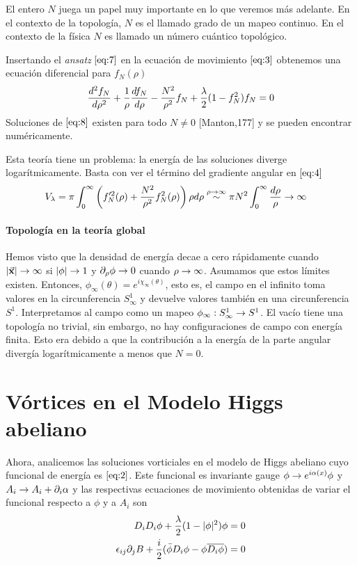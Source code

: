 El entero $N$ juega un papel muy importante en lo que veremos más adelante. En el contexto de la topología, $N$ es el llamado grado de un mapeo continuo. En el contexto de la física $N$ es llamado un número cuántico topológico.

Insertando el \emph{ansatz} $\eqref{eq:7}$ en la ecuación de movimiento $\eqref{eq:3}$ obtenemos una ecuación diferencial para $f_N(\rho)$
\begin{align}
    \frac{d^2f_N}{d\rho^2}+\frac{1}{\rho}\frac{d f_N}{d\rho}-\frac{N^2}{\rho^2}f_N+\frac{\lambda}{2}(1-f_N^2)f_N=0 \label{eq:8}
\end{align}
Soluciones de $\eqref{eq:8}$ existen para todo $N\neq 0$ [Manton,177] y se pueden encontrar numéricamente.

Esta teoría tiene un problema: la energía de las soluciones diverge logarítmicamente. Basta con ver el término del gradiente angular en $\eqref{eq:4}$ 
\begin{align}
    V_\lambda &= \pi\int_0^\infty\left(f'^2_N(\rho)+\frac{N^2}{\rho^2}f_N^2(\rho)\right)\rho d\rho \overset{\rho\rightarrow\infty}{\sim} \pi N^2\int_0^\infty \frac{d\rho}{\rho}\rightarrow\infty \label{eq:9} 
\end{align}

\paragraph{Topología en la teoría global} Hemos visto que la densidad de energía decae a cero rápidamente cuando $|\vec{\mathbf{x}}|\rightarrow\infty$ si $|\phi|\rightarrow 1$ y $\partial_\rho\phi\rightarrow 0$ cuando $\rho\rightarrow\infty$. Asumamos que estos límites existen. Entonces, $\phi_\infty(\theta)=e^{i\chi_\infty(\theta)}$, esto es, el campo en el infinito toma valores en la circunferencia $S^1_\infty$ y devuelve valores también en una circunferencia $S^1$. Interpretamos al campo como un mapeo $\phi_\infty:S^1_\infty\rightarrow S^1$. El vacío tiene una topología no trivial, sin embargo, no hay configuraciones de campo con energía finita. Esto era debido a que la contribución a  la energía de la parte angular divergía logarítmicamente a menos que $N=0$.

\section{Vórtices en el Modelo Higgs abeliano}

Ahora, analicemos las soluciones vorticiales en el modelo de Higgs abeliano cuyo funcional de energía es $\eqref{eq:2}$. Este funcional es invariante gauge $\phi\rightarrow e^{i\alpha(x)}\phi$ y $A_i\rightarrow A_i+\partial_i\alpha$ y las respectivas ecuaciones de movimiento obtenidas de variar el funcional respecto a $\phi$ y a $A_i$ son
\begin{align}
    D_iD_i\phi+\frac{\lambda}{2}(1-|\phi|^2)\phi &= 0 \label{eq:11}\\
    \epsilon_{ij}\partial_jB+\frac{i}{2}(\bar\phi D_i\phi-\phi\overline{D_i\phi}) &= 0 \label{eq:12}
\end{align}
